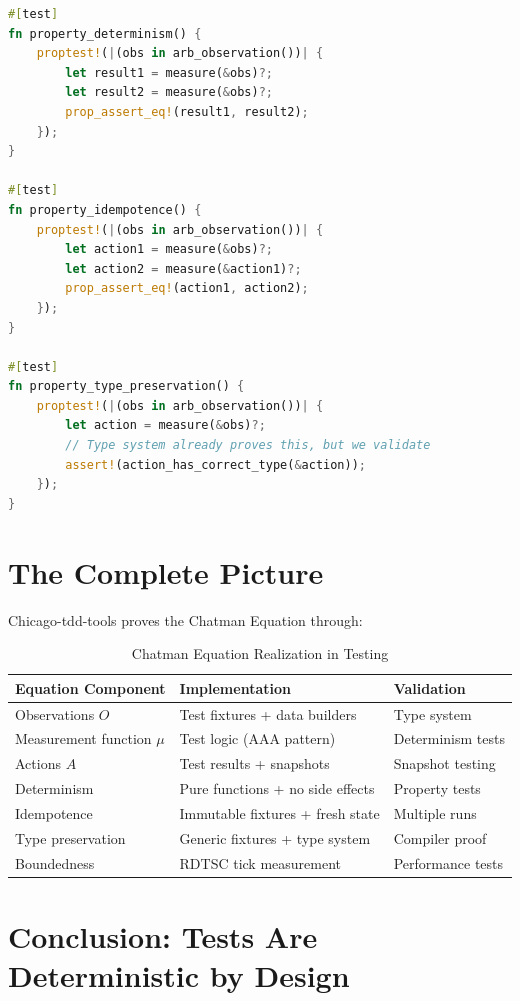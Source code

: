 {\begin{lstlisting}[language=Rust]
#[test]
fn property_determinism() {
    proptest!(|(obs in arb_observation())| {
        let result1 = measure(&obs)?;
        let result2 = measure(&obs)?;
        prop_assert_eq!(result1, result2);
    });
}

#[test]
fn property_idempotence() {
    proptest!(|(obs in arb_observation())| {
        let action1 = measure(&obs)?;
        let action2 = measure(&action1)?;
        prop_assert_eq!(action1, action2);
    });
}

#[test]
fn property_type_preservation() {
    proptest!(|(obs in arb_observation())| {
        let action = measure(&obs)?;
        // Type system already proves this, but we validate
        assert!(action_has_correct_type(&action));
    });
}
\end{lstlisting}

\section{The Complete Picture}

Chicago-tdd-tools proves the Chatman Equation through:

\begin{table}[H]
\centering
\caption{Chatman Equation Realization in Testing}
\begin{tabular}{|l|l|l|}
\hline
\textbf{Equation Component} & \textbf{Implementation} & \textbf{Validation} \\
\hline
Observations $O$ & Test fixtures + data builders & Type system \\
\hline
Measurement function $\mu$ & Test logic (AAA pattern) & Determinism tests \\
\hline
Actions $A$ & Test results + snapshots & Snapshot testing \\
\hline
Determinism & Pure functions + no side effects & Property tests \\
\hline
Idempotence & Immutable fixtures + fresh state & Multiple runs \\
\hline
Type preservation & Generic fixtures + type system & Compiler proof \\
\hline
Boundedness & RDTSC tick measurement & Performance tests \\
\hline
\end{tabular}
\end{table}

\section{Conclusion: Tests Are Deterministic by Design}

}

